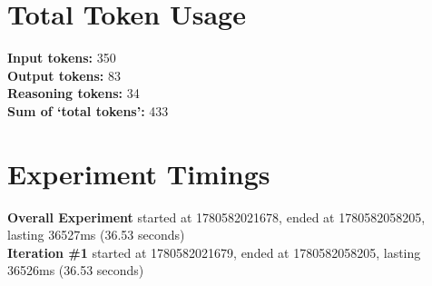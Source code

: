 \documentclass{article}
\begin{document}
\section*{Total Token Usage}
\textbf{Input tokens: }350
\\\textbf{Output tokens: }83
\\\textbf{Reasoning tokens: }34
\\\textbf{Sum of `total tokens': }433
\section*{Experiment Timings}
\textbf{Overall Experiment} started at 1780582021678, ended at 1780582058205, lasting 36527ms (36.53 seconds)
\\\textbf{Iteration \#1} started at 1780582021679, ended at 1780582058205, lasting 36526ms (36.53 seconds)
\end{document}
